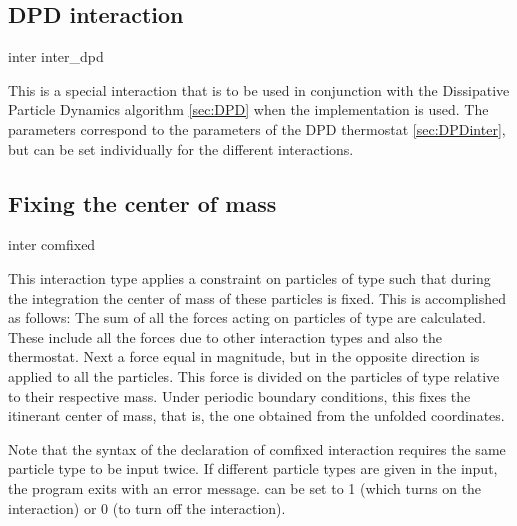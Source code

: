 \subsection{DPD interaction}\label{sec:DPDinter}

\begin{essyntax}
  inter   inter_dpd       
  \begin{features}
  \end{features}
\end{essyntax}

This is a special interaction that is to be used in conjunction with
the Dissipative Particle Dynamics algorithm \ref{sec:DPD} when the
 implementation is used. The parameters correspond
to the parameters of the DPD thermostat \vref{sec:DPDinter}, but can
be set individually for the different interactions.

\subsection{Fixing the center of mass}
\begin{essyntax}
  inter   comfixed 
  \begin{features}
  \end{features}
\end{essyntax}
This interaction type applies a constraint on particles of type
 such that during the integration the center of mass of
these particles is fixed. This is accomplished as follows: The sum of
all the forces acting on particles of type  are
calculated. These include all the forces due to other interaction
types and also the thermostat. Next a force equal in magnitude, but in
the opposite direction is applied to all the particles. This force is
divided on the particles of type  relative to
their respective mass. Under periodic boundary conditions, this fixes
the itinerant center of mass, that is, the one obtained from the
unfolded coordinates.

Note that the syntax of the
declaration of comfixed interaction requires the same particle type to
be input twice. If different particle types are given in the input,
the program exits with an error message.  can be set to 1
(which turns on the interaction) or 0 (to turn off the interaction).


